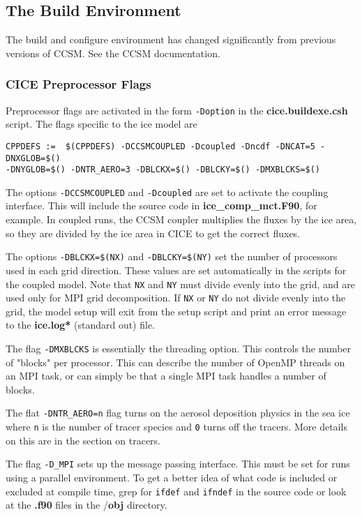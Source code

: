 
\subsection{The Build Environment}

The build and configure environment has changed significantly from previous
versions of CCSM. See the CCSM documentation.

\subsubsection{CICE Preprocessor Flags}

Preprocessor flags are activated in the form {\tt -Doption} in the 
{\bf cice.buildexe.csh} script.  The flags specific to the ice model are

\begin{verbatim}
CPPDEFS :=  $(CPPDEFS) -DCCSMCOUPLED -Dcoupled -Dncdf -DNCAT=5 -DNXGLOB=$()
-DNYGLOB=$() -DNTR_AERO=3 -DBLCKX=$() -DBLCKY=$() -DMXBLCKS=$()
\end{verbatim}

The options {\tt -DCCSMCOUPLED} and  {\tt -Dcoupled} are set to activate the 
coupling interface.  This will include the source code in 
{\bf ice\_comp\_mct.F90}, for example.  In coupled runs, the CCSM coupler 
multiplies the fluxes by the ice area, so they are divided by the ice area 
in CICE to get the correct fluxes.

The options {\tt -DBLCKX=\$(NX)} and {\tt -DBLCKY=\$(NY)} set the number of
processors used in each grid direction.  These values are set automatically
in the scripts for the coupled model.  Note that {\tt NX} and {\tt NY} must 
divide evenly into the grid, and are used only for MPI grid decomposition.  
If {\tt NX} or {\tt NY} do not divide evenly into the grid, the model setup 
will exit from the setup script and print an error message to the 
{\bf ice.log*} (standard out) file.

The flag {\tt -DMXBLCKS} is essentially the threading option. This controls
the number of "blocks" per processor. This can describe the number of OpenMP
threads on an MPI task, or can simply be that a single MPI task handles
a number of blocks.

The flat {\tt -DNTR\_AERO=n} flag turns on the aerosol deposition physics in
the sea ice where {\tt n} is the number of tracer species and {\tt 0} turns
off the tracers. More details on this are in the section on tracers. 

The flag {\tt -D\_MPI} sets up the message passing interface.  This must be set
for runs using a parallel environment.  To get a better idea of what code
is included or excluded at compile time, grep for {\tt ifdef} and {\tt ifndef}
in the source code or look at the {\bf *.f90} files in the /{\bf obj} directory.

